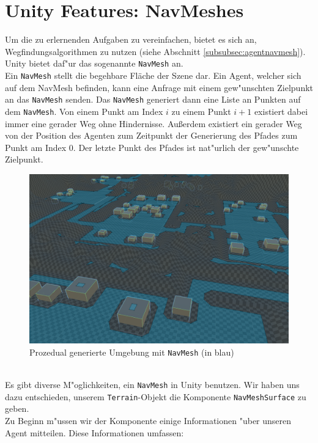 \section{Unity Features: NavMeshes}

Um die zu erlernenden Aufgaben zu vereinfachen, bietet es sich an, Wegfindungsalgorithmen zu nutzen (siehe Abschnitt \ref{subsubsec:agentnavmesh}). Unity bietet daf"ur das sogenannte \texttt{NavMesh} an.
\\
Ein \texttt{NavMesh} stellt die begehbare Fläche der Szene dar. Ein Agent, welcher sich auf dem NavMesh befinden, kann eine Anfrage mit einem gew"unschten Zielpunkt an das \texttt{NavMesh} senden. Das \texttt{NavMesh} generiert dann eine Liste an Punkten auf dem \texttt{NavMesh}. Von einem Punkt am Index $i$ zu einem Punkt $i+1$ existiert dabei immer eine gerader Weg ohne Hindernisse. Außerdem existiert ein gerader Weg von der Position des Agenten zum Zeitpunkt der Generierung des Pfades zum Punkt am Index $0$. Der letzte Punkt des Pfades ist nat"urlich der gew"unschte Zielpunkt.
\begin{figure}
	\centering
	\includegraphics[width=0.8\linewidth]{resources/img/navMesh01.png}
	\caption{Prozedual generierte Umgebung mit \texttt{NavMesh} (in blau)}
	\label{fig:navMesh01}
\end{figure}
\\
Es gibt diverse M"oglichkeiten, ein \texttt{NavMesh} in Unity benutzen. Wir haben uns dazu entschieden, unserem \texttt{Terrain}-Objekt die Komponente \texttt{NavMeshSurface} zu geben.
\\
Zu Beginn m"ussen wir der Komponente einige Informationen "uber unseren Agent mitteilen. Diese Informationen umfassen:
